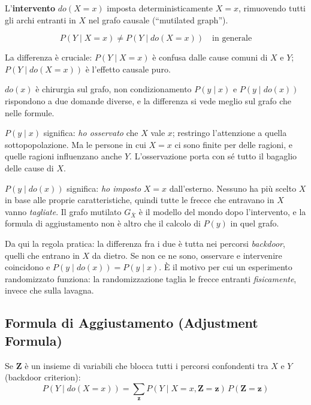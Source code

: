 \begin{definition}
L'\textbf{intervento} $do(X = x)$ imposta deterministicamente $X = x$, rimuovendo tutti gli archi entranti in $X$ nel grafo causale (``mutilated graph'').
\end{definition}

\[
P(Y \mid X=x) \neq P(Y \mid do(X=x)) \quad \text{in generale}
\]

La differenza è cruciale: $P(Y \mid X=x)$ è confusa dalle cause comuni di $X$ e $Y$; $P(Y \mid do(X=x))$ è l'effetto causale puro.

\begin{intuizione}{$do(x)$ è chirurgia sul grafo, non condizionamento}
$P(y \mid x)$ e $P(y \mid do(x))$ rispondono a due domande diverse, e la differenza si vede meglio sul grafo che nelle formule.

$P(y \mid x)$ significa: \emph{ho osservato} che $X$ vale $x$; restringo l'attenzione a quella sottopopolazione. Ma le persone in cui $X = x$ ci sono finite per delle ragioni, e quelle ragioni influenzano anche $Y$. L'osservazione porta con sé tutto il bagaglio delle cause di $X$.

$P(y \mid do(x))$ significa: \emph{ho imposto} $X = x$ dall'esterno. Nessuno ha più scelto $X$ in base alle proprie caratteristiche, quindi tutte le frecce che entravano in $X$ vanno \emph{tagliate}. Il grafo mutilato $G_{\bar X}$ è il modello del mondo dopo l'intervento, e la formula di aggiustamento non è altro che il calcolo di $P(y)$ in quel grafo.

Da qui la regola pratica: la differenza fra i due è tutta nei percorsi \emph{backdoor}, quelli che entrano in $X$ da dietro. Se non ce ne sono, osservare e intervenire coincidono e $P(y \mid do(x)) = P(y \mid x)$. È il motivo per cui un esperimento randomizzato funziona: la randomizzazione taglia le frecce entranti \emph{fisicamente}, invece che sulla lavagna.
\end{intuizione}

\subsection{Formula di Aggiustamento (Adjustment Formula)}

Se $\mathbf{Z}$ è un insieme di variabili che blocca tutti i percorsi confondenti tra $X$ e $Y$ (backdoor criterion):
\[
P(Y \mid do(X=x)) = \sum_{\mathbf{z}} P(Y \mid X=x, \mathbf{Z}=\mathbf{z})\,P(\mathbf{Z}=\mathbf{z})
\]

